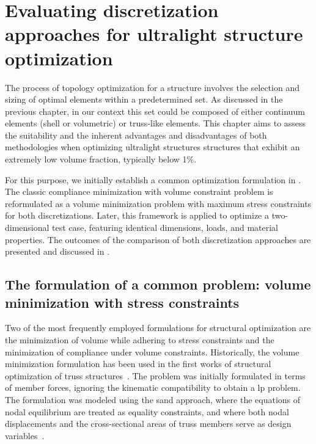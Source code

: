 \setchapterpreamble[u]{\margintoc}
\glsresetall %
\chapter{Evaluating discretization approaches for ultralight structure optimization}
The process of topology optimization for a structure involves the selection and sizing of optimal elements within a predetermined set. As discussed in the previous chapter, in our context this set could be composed of either continuum elements (shell or volumetric) or truss-like elements. This chapter aims to assess the suitability and the inherent advantages and disadvantages of both methodologies when optimizing ultralight structures \ie structures that exhibit  an extremely low volume fraction, typically below 1\%. 

For this purpose, we initially establish a common optimization formulation in . The classic compliance minimization with volume constraint problem is reformulated as a volume minimization problem with maximum stress constraints for both discretizations. Later, this framework is applied to optimize a two-dimensional test case, featuring identical dimensions, loads, and material properties. The outcomes of the comparison of both discretization approaches are presented and discussed in . 

\section{The formulation of a common problem: volume minimization with stress constraints} \label{sec:03_common_prob}
Two of the most frequently employed formulations for structural optimization are the minimization of volume while adhering to stress constraints and the minimization of compliance under volume constraints. Historically, the volume minimization formulation has been used in the first works of structural optimization of truss structures~. The problem was initially formulated in terms of member forces, ignoring the kinematic compatibility to obtain a \gls{lp} problem. The formulation was modeled using the \acrfull{sand} approach, where the equations of nodal equilibrium are treated as equality constraints, and where both nodal displacements and the cross-sectional areas of truss members serve as design variables~. 

